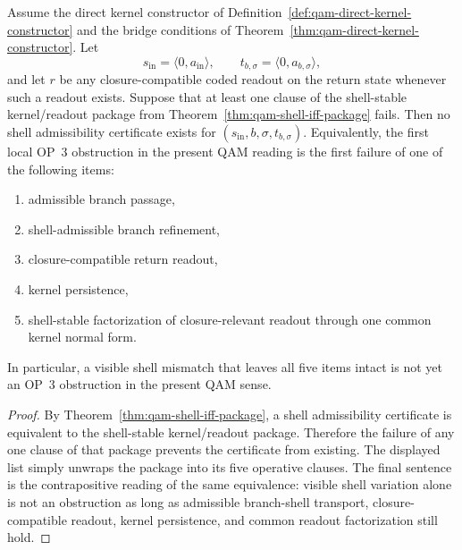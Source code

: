 \begin{lemma}\label{lem:qam-shell-obstruction}
Assume the direct kernel constructor of Definition~\ref{def:qam-direct-kernel-constructor} and the bridge conditions of Theorem~\ref{thm:qam-direct-kernel-constructor}. Let
\[
s_{\mathrm{in}}=\langle 0,a_{\mathrm{in}}\rangle,
\qquad
 t_{b,\sigma}=\langle 0,a_{b,\sigma}\rangle,
\]
and let $r$ be any closure-compatible coded readout on the return state whenever such a readout exists. Suppose that at least one clause of the shell-stable kernel/readout package from Theorem~\ref{thm:qam-shell-iff-package} fails. Then no shell admissibility certificate exists for $(s_{\mathrm{in}},b,\sigma,t_{b,\sigma})$. Equivalently, the first local OP~3 obstruction in the present QAM reading is the first failure of one of the following items:
\begin{enumerate}[leftmargin=2em,label=(\roman*)]
  \item admissible branch passage,
  \item shell-admissible branch refinement,
  \item closure-compatible return readout,
  \item kernel persistence,
  \item shell-stable factorization of closure-relevant readout through one common kernel normal form.
\end{enumerate}
In particular, a visible shell mismatch that leaves all five items intact is not yet an OP~3 obstruction in the present QAM sense.
\end{lemma}

\begin{proof}
By Theorem~\ref{thm:qam-shell-iff-package}, a shell admissibility certificate is equivalent to the shell-stable kernel/readout package. Therefore the failure of any one clause of that package prevents the certificate from existing. The displayed list simply unwraps the package into its five operative clauses. The final sentence is the contrapositive reading of the same equivalence: visible shell variation alone is not an obstruction as long as admissible branch-shell transport, closure-compatible readout, kernel persistence, and common readout factorization still hold.
\end{proof}

